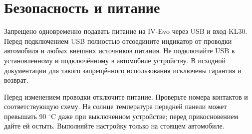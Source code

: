 \chapter{Безопасность и питание}
Запрещено одновременно подавать питание на IV-Evo через USB и вход KL30. Перед подключением USB полностью отсоедините индикатор от проводки автомобиля и любых внешних источников питания. Не подключайте USB к установленному и подключённому в автомобиле устройству. В исходной документации для такого запрещённого использования исключены гарантия и возврат.

Перед изменением проводки отключите питание. Проверьте номера контактов и соответствующую схему. На солнце температура передней панели может превышать 90 $^\circ$C даже при выключенном устройстве; перед прикосновением дайте ей остыть. Выполняйте настройку только на стоящем автомобиле.

